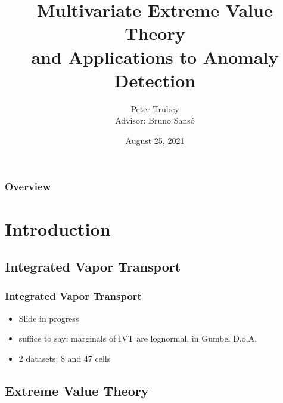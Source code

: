 \documentclass[aspectratio=169]{beamer}
\title{Multivariate Extreme Value Theory \\ and Applications to Anomaly Detection}
\author{Peter Trubey \\ Advisor: Bruno Sans{\'o}}
\institute{UCSC - Statistics Department}
\date[8/25/2021]{August 25, 2021}
\begin{document}
\begin{frame}[plain]
  \titlepage
\end{frame}

\begin{frame}[plain]
  \frametitle{Overview}
  \tableofcontents
\end{frame}

\section{Introduction}

\subsection{Integrated Vapor Transport}
\begin{frame}
  \frametitle{Integrated Vapor Transport}
  \begin{itemize}
      \item Slide in progress
      \item suffice to say: marginals of IVT are lognormal, in Gumbel D.o.A.
      \item 2 datasets; 8 and 47 cells
  \end{itemize}
\end{frame}

\subsection{Extreme Value Theory}
\end{document}
